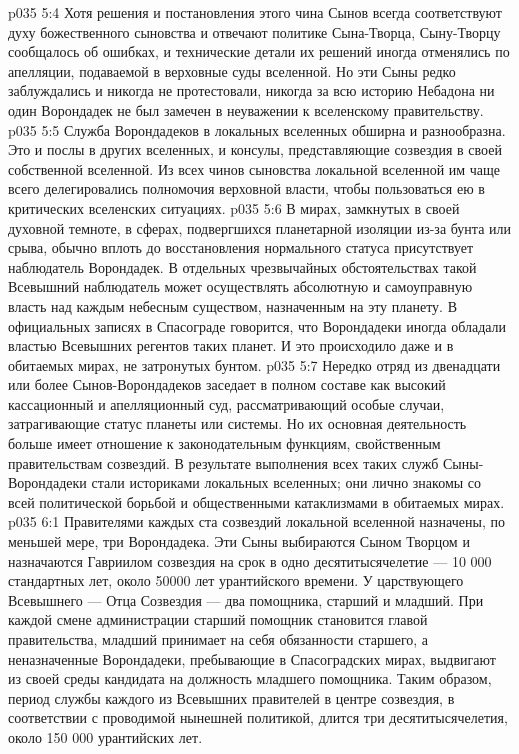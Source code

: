 \vs p035 5:4 Хотя решения и постановления этого чина Сынов всегда соответствуют духу божественного сыновства и отвечают политике Сына\hyp{}Творца, Сыну\hyp{}Творцу сообщалось об ошибках, и технические детали их решений иногда отменялись по апелляции, подаваемой в верховные суды вселенной. Но эти Сыны редко заблуждались и никогда не протестовали, никогда за всю историю Небадона ни один Ворондадек не был замечен в неуважении к вселенскому правительству.
\vs p035 5:5 Служба Ворондадеков в локальных вселенных обширна и разнообразна. Это и послы в других вселенных, и консулы, представляющие созвездия в своей собственной вселенной. Из всех чинов сыновства локальной вселенной им чаще всего делегировались полномочия верховной власти, чтобы пользоваться ею в критических вселенских ситуациях.
\vs p035 5:6 В мирах, замкнутых в своей духовной темноте, в сферах, подвергшихся планетарной изоляции из\hyp{}за бунта или срыва, обычно вплоть до восстановления нормального статуса присутствует наблюдатель Ворондадек. В отдельных чрезвычайных обстоятельствах такой Всевышний наблюдатель может осуществлять абсолютную и самоуправную власть над каждым небесным существом, назначенным на эту планету. В официальных записях в Спасограде говорится, что Ворондадеки иногда обладали властью Всевышних регентов таких планет. И это происходило даже и в обитаемых мирах, не затронутых бунтом.
\vs p035 5:7 Нередко отряд из двенадцати или более Сынов\hyp{}Ворондадеков заседает в полном составе как высокий кассационный и апелляционный суд, рассматривающий особые случаи, затрагивающие статус планеты или системы. Но их основная деятельность больше имеет отношение к законодательным функциям, свойственным правительствам созвездий. В результате выполнения всех таких служб Сыны\hyp{}Ворондадеки стали историками локальных вселенных; они лично знакомы со всей политической борьбой и общественными катаклизмами в обитаемых мирах.
\vs p035 6:1 Правителями каждых ста созвездий локальной вселенной назначены, по меньшей мере, три Ворондадека. Эти Сыны выбираются Сыном Творцом и назначаются Гавриилом  созвездия на срок в одно десятитысячелетие --- 10 000 стандартных лет, около 50000 лет урантийского времени. У царствующего Всевышнего --- Отца Созвездия --- два помощника, старший и младший. При каждой смене администрации старший помощник становится главой правительства, младший принимает на себя обязанности старшего, а неназначенные Ворондадеки, пребывающие в Спасоградских мирах, выдвигают из своей среды кандидата на должность младшего помощника. Таким образом, период службы каждого из Всевышних правителей в центре созвездия, в соответствии с проводимой нынешней политикой, длится три десятитысячелетия, около 150 000 урантийских лет.
